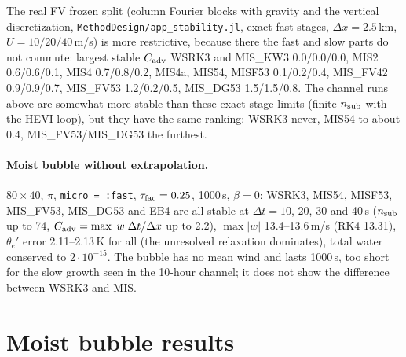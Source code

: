 \documentclass[11pt,a4paper]{article}
\newcommand{\code}[1]{\texttt{#1}}
\newcommand{\dt}{\Delta t}
\begin{document}
The real FV frozen split (column Fourier blocks with gravity and the vertical discretization,
\code{MethodDesign/app\_stability.jl}, exact fast stages, $\Delta x=2.5$\,km, $U=10/20/40$\,m/s) is more
restrictive, because there the fast and slow parts do not commute: largest stable $C_{\rm adv}$ WSRK3 and
MIS\_KW3 0.0/0.0/0.0, MIS2 0.6/0.6/0.1, MIS4 0.7/0.8/0.2, MIS4a, MIS54, MISF53 0.1/0.2/0.4, MIS\_FV42
0.9/0.9/0.7, MIS\_FV53 1.2/0.2/0.5, MIS\_DG53 1.5/1.5/0.8. The channel runs above are somewhat more stable
than these exact-stage limits (finite $n_{\rm sub}$ with the HEVI loop), but they have the same ranking:
WSRK3 never, MIS54 to about 0.4, MIS\_FV53/MIS\_DG53 the furthest.

\paragraph{Moist bubble without extrapolation.} $80\times40$, $\pi$, \code{micro = :fast}, $\tau_{\rm fac}=0.25$,
1000\,s, $\beta=0$: WSRK3, MIS54, MISF53, MIS\_FV53, MIS\_DG53 and EB4 are all stable at $\dt=10$, 20, 30
and 40\,s ($n_{\rm sub}$ up to 74, $C_{\rm adv}=\max|w|\dt/\Delta x$ up to 2.2), $\max|w|$ 13.4--13.6\,m/s
(RK4 13.31), $\theta_e'$ error 2.11--2.13\,K for all (the unresolved relaxation dominates), total water
conserved to $2\cdot10^{-15}$. The bubble has no mean wind and lasts 1000\,s, too short for the slow growth
seen in the 10-hour channel; it does not show the difference between WSRK3 and MIS.

\section{Moist bubble results}\label{sec:moistres}
\end{document}
